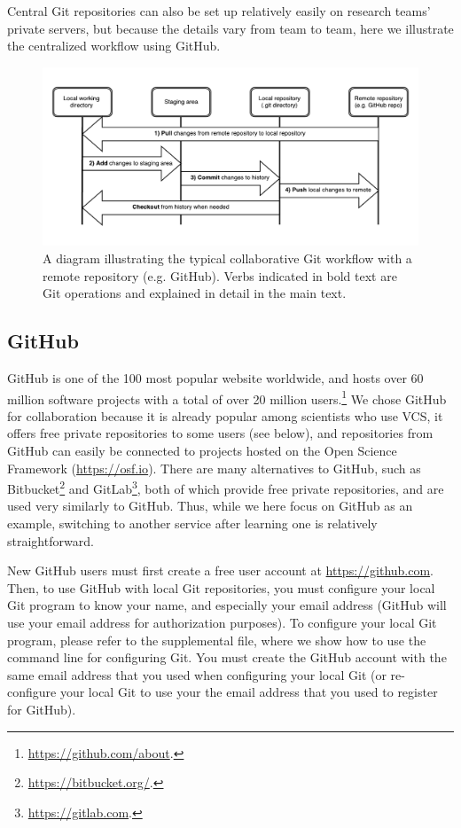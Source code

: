 \documentclass[
  american,
  ,doc,floatsintext]{apa6}
\begin{document}
Central Git repositories can also be set up relatively easily on research teams' private servers, but because the details vary from team to team, here we illustrate the centralized workflow using GitHub.

\begin{figure}

{\centering \includegraphics[width=6in]{../data/git-diagram-collaborate} 

}

\caption{A diagram illustrating the typical collaborative Git workflow with a remote repository (e.g. GitHub). Verbs indicated in bold text are Git operations and explained in detail in the main text.}\label{fig:git-diagram-collaborate}
\end{figure}

\hypertarget{github}{%
\subsection{GitHub}\label{github}}

GitHub is one of the 100 most popular website worldwide, and hosts over 60 million software projects with a total of over 20 million users.\footnote{\url{https://github.com/about}.} We chose GitHub for collaboration because it is already popular among scientists who use VCS, it offers free private repositories to some users (see below), and repositories from GitHub can easily be connected to projects hosted on the Open Science Framework (\url{https://osf.io}). There are many alternatives to GitHub, such as Bitbucket\footnote{\url{https://bitbucket.org/}.} and GitLab\footnote{\url{https://gitlab.com}.}, both of which provide free private repositories, and are used very similarly to GitHub. Thus, while we here focus on GitHub as an example, switching to another service after learning one is relatively straightforward.

New GitHub users must first create a free user account at \url{https://github.com}. Then, to use GitHub with local Git repositories, you must configure your local Git program to know your name, and especially your email address (GitHub will use your email address for authorization purposes). To configure your local Git program, please refer to the supplemental file, where we show how to use the command line for configuring Git. You must create the GitHub account with the same email address that you used when configuring your local Git (or re-configure your local Git to use your the email address that you used to register for GitHub).
\end{document}
